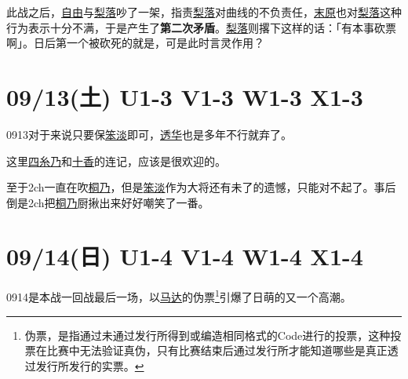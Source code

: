 此战之后，\uline{自由}与\uline{梨落}吵了一架，指责\uline{梨落}对曲线的不负责任，\uline{末原}也对\uline{梨落}这种行为表示十分不满，于是产生了\textbf{第二次矛盾}。\uline{梨落}则撂下这样的话：「有本事砍票啊」。日后第一个被砍死的就是，可是此时言灵作用？

\section{09/13(土) U1-3 V1-3 W1-3 X1-3}


0913对于来说只要保\uline{笨淡}即可，\uline{透华}也是多年不行就弃了。

这里\uline{四糸乃}和\uline{十香}的连记，应该是很欢迎的。

至于2ch一直在吹\uline{桐乃}，但是\uline{笨淡}作为大将还有未了的遗憾，只能对不起了。事后倒是2ch把\uline{桐乃}厨揪出来好好嘲笑了一番。

\section{09/14(日) U1-4 V1-4 W1-4 X1-4}

0914是本战一回战最后一场，以\uline{马达}的伪票\footnote{伪票，是指通过未通过发行所得到或编造相同格式的Code进行的投票，这种投票在比赛中无法验证真伪，只有比赛结束后通过发行所才能知道哪些是真正透过发行所发行的实票。}引爆了日萌的又一个高潮。

